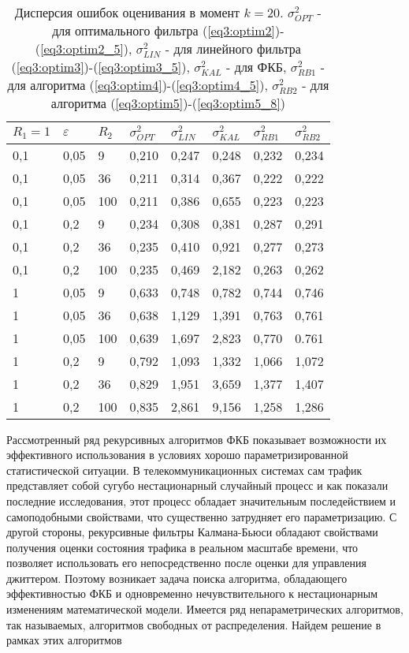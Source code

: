 \begin{table} [h]
  \centering
  \parbox{15cm}{\caption{Дисперсия ошибок оценивания в момент $k=20$. $\sigma_{OPT}^2$ - для оптимального фильтра (\ref{eq3:optim2})-(\ref{eq3:optim2_5}), $\sigma_{LIN}^2$ - для линейного фильтра (\ref{eq3:optim3})-(\ref{eq3:optim3_5}), $\sigma_{KAL}^2$ - для ФКБ, $\sigma_{RB1}^2$ - для алгоритма (\ref{eq3:optim4})-(\ref{eq3:optim4_5}), $\sigma_{RB2}^2$ - для алгоритма (\ref{eq3:optim5})-(\ref{eq3:optim5_8}) \cite{Klekis}} \label{disp_opt}} 
\begin{center}
\begin{tabular}{|l|l|l|l|l|l|l|l|} \hline \hline
$R_1=1$ & $\varepsilon$ & $R_2$ & $\sigma_{OPT}^2$ & $\sigma_{LIN}^2$ & $\sigma_{KAL}^2$ & $\sigma_{RB1}^2$ & $\sigma_{RB2}^2$\\\hline \hline
0,1 & 0,05 & 9 & 0,210 & 0,247 & 0,248 & 0,232 & 0,234\\\hline \hline
0,1 & 0,05 & 36 & 0,211 & 0,314 & 0,367 & 0,222 & 0,222\\\hline
0,1 & 0,05 & 100 & 0,211 & 0,386 & 0,655 & 0,223 & 0,223\\\hline
0,1 & 0,2 & 9 & 0,234 & 0,308 & 0,381 & 0,287 & 0,291\\\hline
0,1 & 0,2 & 36 & 0,235 & 0,410 & 0,921 & 0,277 & 0,273\\\hline
0,1 & 0,2 & 100 & 0,235 & 0,469 & 2,182 & 0,263 & 0,262\\\hline
1 & 0,05 & 9 & 0,633 & 0,748 & 0,782 & 0,744 & 0,746\\\hline
1 & 0,05 & 36 & 0,638 & 1,129 & 1,391 & 0,763 & 0,761\\\hline
1 & 0,05 & 100 & 0,639 & 1,697 & 2,823 & 0,770 & 0.761\\\hline
1 & 0,2 & 9 & 0,792 & 1,093 & 1,332 & 1,066 & 1,072\\\hline
1 & 0,2 & 36 & 0,829 & 1,951 & 3,659 & 1,377 & 1,407\\\hline
1 & 0,2 & 100 & 0,835 & 2,861 & 9,156 & 1,258 & 1,286\\\hline
\end{tabular}
\end{center}
\end{table}

Рассмотренный ряд рекурсивных алгоритмов ФКБ показывает возможности их эффективного использования в условиях хорошо параметризированной статистической ситуации.
В телекоммуникационных системах сам трафик представляет собой сугубо нестационарный случайный процесс и как показали последние исследования, этот процесс обладает значительным последействием и самоподобными свойствами, что существенно затрудняет его параметризацию.
С другой стороны, рекурсивные фильтры Калмана-Бьюси обладают свойствами получения оценки состояния трафика в реальном масштабе времени, что позволяет использовать его непосредственно после оценки для управления джиттером.
Поэтому возникает задача поиска алгоритма, обладающего эффективностью ФКБ и одновременно нечувствительного к нестационарным изменениям математической модели.
Имеется ряд непараметрических алгоритмов, так называемых, алгоритмов свободных от распределения. Найдем решение в рамках этих алгоритмов


